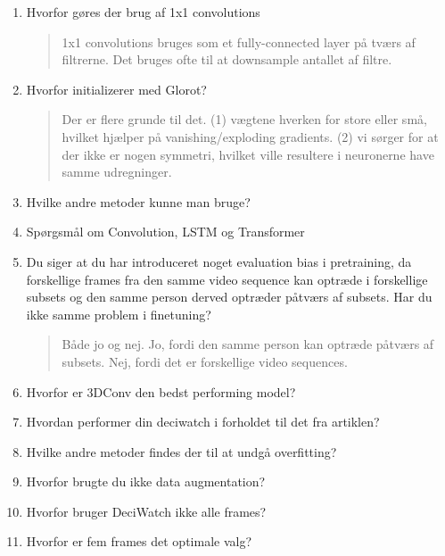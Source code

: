\documentclass[a4paper]{report}
\begin{document}
\begin{enumerate}
    \item Hvorfor gøres der brug af 1x1 convolutions
    \begin{quote}
      1x1 convolutions bruges som et fully-connected layer på tværs af filtrerne. Det bruges ofte til at downsample antallet af filtre.
    \end{quote}
    \item Hvorfor initializerer med Glorot?
    \begin{quote}
      Der er flere grunde til det. (1) vægtene hverken for store eller små, hvilket hjælper på vanishing/exploding gradients. (2) vi sørger for at der ikke er nogen symmetri, hvilket ville resultere i neuronerne have samme udregninger. 
    \end{quote}
    \item Hvilke andre metoder kunne man bruge?
    \item Spørgsmål om Convolution, LSTM og Transformer
    \item Du siger at du har introduceret noget evaluation bias i pretraining, da forskellige frames fra den samme video sequence kan optræde i forskellige subsets og den samme person derved optræder påtværs af subsets. Har du ikke samme problem i finetuning?
    \begin{quote}
      Både jo og nej. Jo, fordi den samme person kan optræde påtværs af subsets. Nej, fordi det er forskellige video sequences.
    \end{quote}
    \item Hvorfor er 3DConv den bedst performing model?
    \item Hvordan performer din deciwatch i forholdet til det fra artiklen?
    \item Hvilke andre metoder findes der til at undgå overfitting?
    \item Hvorfor brugte du ikke data augmentation?
    \item Hvorfor bruger DeciWatch ikke alle frames?
    \item Hvorfor er fem frames det optimale valg?
\end{enumerate}
\end{document}
